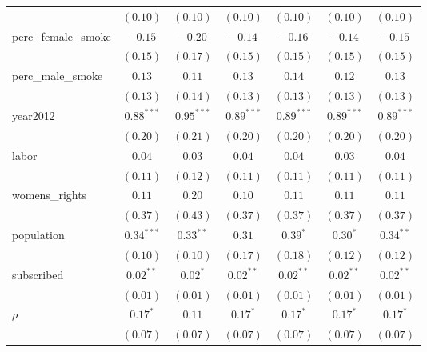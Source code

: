 \begin{table}[!h]
\begin{center}
\begin{tabular}{l c c c c c c }
                        & $(0.10)$     & $(0.10)$     & $(0.10)$     & $(0.10)$     & $(0.10)$     & $(0.10)$     \\
perc\_female\_smoke     & $-0.15$      & $-0.20$      & $-0.14$      & $-0.16$      & $-0.14$      & $-0.15$      \\
                        & $(0.15)$     & $(0.17)$     & $(0.15)$     & $(0.15)$     & $(0.15)$     & $(0.15)$     \\
perc\_male\_smoke       & $0.13$       & $0.11$       & $0.13$       & $0.14$       & $0.12$       & $0.13$       \\
                        & $(0.13)$     & $(0.14)$     & $(0.13)$     & $(0.13)$     & $(0.13)$     & $(0.13)$     \\
year2012                & $0.88^{***}$ & $0.95^{***}$ & $0.89^{***}$ & $0.89^{***}$ & $0.89^{***}$ & $0.89^{***}$ \\
                        & $(0.20)$     & $(0.21)$     & $(0.20)$     & $(0.20)$     & $(0.20)$     & $(0.20)$     \\
labor                   & $0.04$       & $0.03$       & $0.04$       & $0.04$       & $0.03$       & $0.04$       \\
                        & $(0.11)$     & $(0.12)$     & $(0.11)$     & $(0.11)$     & $(0.11)$     & $(0.11)$     \\
womens\_rights          & $0.11$       & $0.20$       & $0.10$       & $0.11$       & $0.11$       & $0.11$       \\
                        & $(0.37)$     & $(0.43)$     & $(0.37)$     & $(0.37)$     & $(0.37)$     & $(0.37)$     \\
population              & $0.34^{***}$ & $0.33^{**}$  & $0.31$       & $0.39^{*}$   & $0.30^{*}$   & $0.34^{**}$  \\
                        & $(0.10)$     & $(0.10)$     & $(0.17)$     & $(0.18)$     & $(0.12)$     & $(0.12)$     \\
subscribed              & $0.02^{**}$  & $0.02^{*}$   & $0.02^{**}$  & $0.02^{**}$  & $0.02^{**}$  & $0.02^{**}$  \\
                        & $(0.01)$     & $(0.01)$     & $(0.01)$     & $(0.01)$     & $(0.01)$     & $(0.01)$     \\
$\rho$                  & $0.17^{*}$   & $0.11$       & $0.17^{*}$   & $0.17^{*}$   & $0.17^{*}$   & $0.17^{*}$   \\
                        & $(0.07)$     & $(0.07)$     & $(0.07)$     & $(0.07)$     & $(0.07)$     & $(0.07)$     \\

\end{tabular}
\end{center}
\end{table}
